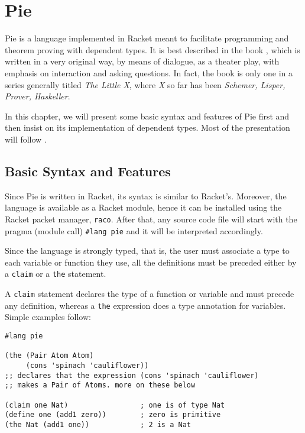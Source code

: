 \chapter{Pie}

Pie is a language implemented in Racket meant to facilitate programming
and theorem proving with dependent types. It is best described in the
book \cite{typer}, which is written in a very original way, by means of
dialogue, as a theater play, with emphasis on interaction and asking
questions. In fact, the book is only one in a series generally titled
\emph{The Little X}, where \emph{X} so far has been
\emph{Schemer, Lisper, Prover, Haskeller}.

In this chapter, we will present some basic syntax and features of Pie
first and then insist on its implementation of dependent types. Most
of the presentation will follow \cite{typer}.

\section{Basic Syntax and Features}

Since Pie is written in Racket, its syntax is similar to Racket's.
Moreover, the language is available as a Racket module, hence it can be
installed using the Racket packet manager, \texttt{raco}. After that,
any source code file will start with the pragma (module call)
\texttt{\#lang pie} and it will be interpreted accordingly.

Since the language is strongly typed, that is, the user must associate a
type to each variable or function they use, all the definitions must be
preceded either by a \texttt{claim} or a \texttt{the} statement.

A \texttt{claim} statement declares the type of a function or variable
and must precede any definition, whereas a \texttt{the} expression
does a type annotation for variables. Simple examples follow:
{
  \small
\begin{verbatim}
#lang pie

(the (Pair Atom Atom)
     (cons 'spinach 'cauliflower))
;; declares that the expression (cons 'spinach 'cauliflower)
;; makes a Pair of Atoms. more on these below

(claim one Nat)                 ; one is of type Nat
(define one (add1 zero))        ; zero is primitive
(the Nat (add1 one))            ; 2 is a Nat
\end{verbatim}
}

